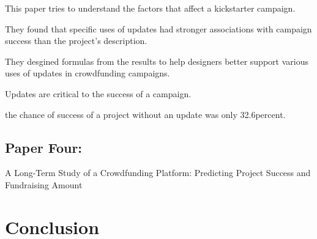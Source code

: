 \documentclass{scrartcl}
\begin{document}
This paper tries to understand the factors that affect a kickstarter campaign.

They found that specific uses of updates had stronger associations with campaign success than the project’s description.

They desgined formulas from the results to help designers better support various uses of updates in crowdfunding campaigns.

Updates are critical to the success of a campaign.

the chance of success of a project without an update was only 32.6percent.

\subsection{Paper Four:}

A Long-Term Study of a Crowdfunding Platform: Predicting Project Success and Fundraising Amount
\cite{Chung:2015}

\section{}


\section{Conclusion}




\end{document}
